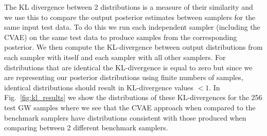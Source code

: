 \documentclass[%
showpacs,
 amsmath,amssymb,
 aps,
 twocolumn,
 prl,
 reprint,
floatfix,
]{revtex4-1}
\begin{document}
%
%
The \ac{KL} divergence between 2 distributions is a measure of their similarity
and we use this to compare the output posterior estimates between samplers for
the same input test data. To do this we run each independent sampler (including
the \ac{CVAE}) on the same test data to produce samples from the corresponding
posterior. We then compute the \ac{KL}-divergence between output distributions
from each sampler with itself and each sampler with all other samplers. For
distributions that are identical the \ac{KL}-divergence is equal to zero but
since we are representing our posterior distributions using finite numbers of
samples, identical distributions should result in KL-divergence values $<1$. In
Fig.~\ref{fig:kl_results} we show the distributions of these
\ac{KL}-divergences for the 256 test \ac{GW} samples where we see that the
\ac{CVAE} approach when compared to the benchmark samplers have distributions
consistent with those produced when comparing between 2 different benchmark
samplers.


\end{document}
